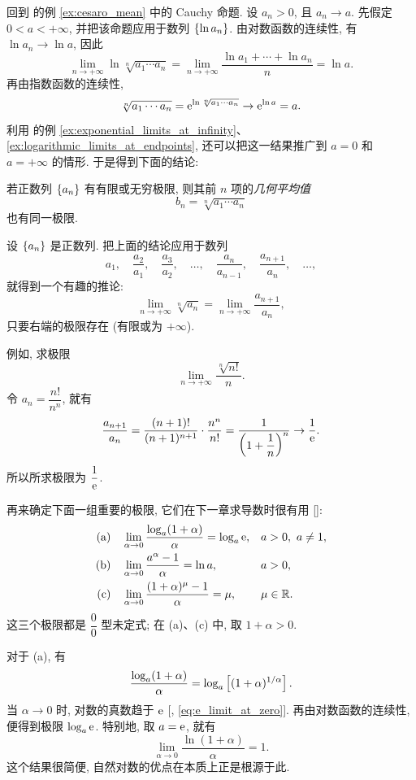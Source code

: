 \label{prop:geometric_mean_limit}
回到  的例 \ref{ex:cesaro_mean} 中的 Cauchy 命题.
设 $a_n>0$, 且 $a_n\to a$. 先假定 $0<a<+\infty$, 并把该命题应用于数列 $\{\ln a_{n}\}$.
由对数函数的连续性, 有 $\ln a_n\to\ln a$, 因此
$$
\lim_{n\to+\infty}\ln\sqrt[n]{a_1\cdots a_n}
=\lim_{n\to+\infty}\frac{\ln a_1+\cdots+\ln a_n}{n}=\ln a.
$$
再由指数函数的连续性,
$$
\sqrt[n]{a_1\cdots a_n}
=\mathrm{e}^{\ln\sqrt[n]{a_1\cdots a_n}}\to\mathrm{e}^{\ln a}=a.
$$
利用  的例 \ref{ex:exponential_limits_at_infinity}、
\ref{ex:logarithmic_limits_at_endpoints}, 还可以把这一结果推广到 $a=0$ 和 $a=+\infty$ 的情形.
于是得到下面的结论:

{\kaishu 若正数列 $\{a_{n}\}$ 有有限或无穷极限, 则其前 $n$ 项的\emph{几何平均值}
$$
b_n=\sqrt[n]{a_1\cdots a_n}
$$
也有同一极限.}

\label{ex:root_limit_from_ratio}
设 $\{a_{n}\}$ 是正数列. 把上面的结论应用于数列
$$
a_1,\quad\frac{a_2}{a_1},\quad\frac{a_3}{a_2},\quad\ldots,\quad
\frac{a_n}{a_{n-1}},\quad\frac{a_{n+1}}{a_n},\quad\ldots,
$$
就得到一个有趣的推论:
$$
\lim_{n\to+\infty}\sqrt[n]{a_n}
=\lim_{n\to+\infty}\frac{a_{n+1}}{a_n},
$$
只要右端的极限存在 (有限或为 $+\infty$).

例如, 求极限
$$
\lim_{n\to+\infty}\frac{\sqrt[n]{n!}}n.
$$
令 $a_n=\dfrac{n!}{n^n}$, 就有
$$
\frac{a_{n+1}}{a_n}
=\frac{(n+1)!}{(n+1)^{n+1}}\cdot\frac{n^n}{n!}
=\frac1{\left( 1+\dfrac1n \right)^n}\to\frac1{\mathrm{e}}.
$$
所以所求极限为 $\dfrac1{\mathrm{e}}$.

\label{ex:logarithmic_exponential_power_increment_limits}\label{derivative_ex}
再来确定下面一组重要的极限, 它们在下一章求导数时很有用 []:
\begin{align*}
\text{(a)}\quad&\lim_{\alpha\to0}\frac{\log_a(1+\alpha)}{\alpha}=\log_a\mathrm{e},
&&a>0,\ a\neq1,\\
\text{(b)}\quad&\lim_{\alpha\to0}\frac{a^\alpha-1}{\alpha}=\ln a,
&&a>0,\\
\text{(c)}\quad&\lim_{\alpha\to0}\frac{(1+\alpha)^\mu-1}{\alpha}=\mu,
&&\mu\in\mathbb{R}.
\end{align*}
这三个极限都是 $\dfrac00$ 型未定式; 在 (a)、(c) 中, 取 $1+\alpha>0$.

对于 (a), 有
$$
\frac{\log_a(1+\alpha)}{\alpha}
=\log_a\left[ (1+\alpha)^{1/\alpha} \right].
$$
当 $\alpha\to0$ 时, 对数的真数趋于 $\mathrm{e}$ [, \eqref{eq:e_limit_at_zero}].
再由对数函数的连续性, 便得到极限 $\log_a\mathrm{e}$.
特别地, 取 $a=\mathrm{e}$, 就有
$$
\lim_{\alpha\to0}\frac{\ln(1+\alpha)}{\alpha}=1.
$$
这个结果很简便, 自然对数的优点在本质上正是根源于此.

